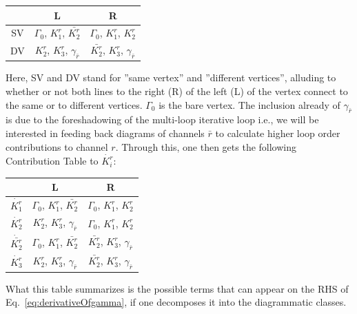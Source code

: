\documentclass[12pt,a4paper,roman]{article}
\begin{document}
\begin{center}
\renewcommand{\tabcolsep}{5pt} 
\renewcommand{\arraystretch}{1.2}
\begin{tabular}{| c| | c | c|} 
\hline
          &  L & R \\ 
          \hline\hline
 SV   & $\Gamma_0$, $K_1^r$, $\bar{K_2^r}$ & $\Gamma_0$, $K_1^r$, $K_2^r$\\ 
  DV & $K_2^r$, $K_3^r$, $\gamma_{\bar{r}}$  & $\bar{K_2^r}$, $K_3^r$, $\gamma_{\bar{r}}$\\ 
 \hline
\end{tabular}
\end{center}
Here, SV and DV stand for ''same vertex'' and ''different vertices'', alluding to whether or not both lines to the right (R) of the left (L) of the vertex connect to the same or to different vertices. 
$\Gamma_0$ is the bare vertex.
The inclusion already of $\gamma_{\bar{r}}$ is due to the foreshadowing of the multi-loop iterative loop i.e., we will be interested in feeding back diagrams of channels $\bar{r}$ to calculate higher loop order contributions to channel $r$.
Through this, one then gets the following Contribution Table to $\dot{K_i^r}$:

\begin{center}
\renewcommand{\tabcolsep}{5pt} 
\renewcommand{\arraystretch}{1.2}
\begin{tabular}{| c| | c | c|} 
\hline
          &  L & R \\ 
          \hline\hline
 $\dot{K_1^r}$  & $\Gamma_0$, $K_1^r$, $\bar{K_2^r}$ & $\Gamma_0$, $K_1^r$, $K_2^r$\\ 
 $\dot{K_2^r}$ & $K_2^r$, $K_3^r$, $\gamma_{\bar{r}}$  & $\Gamma_0$, $K_1^r$, $K_2^r$\\
 $\dot{\bar{K_2^r}}$ & $\Gamma_0$, $K_1^r$, $\bar{K_2^r}$ & $\bar{K_2^r}$, $K_3^r$, $\gamma_{\bar{r}}$\\ 
 $\dot{K_3^r}$ &  $K_2^r$, $K_3^r$, $\gamma_{\bar{r}}$   & $\bar{K_2^r}$, $K_3^r$, $\gamma_{\bar{r}}$\\
 \hline
\end{tabular}
\end{center}

What this table summarizes is the possible terms that can appear on the RHS of Eq.~\eqref{eq:derivativeOfgamma}, if one decomposes it into the diagrammatic classes.






\end{document}

